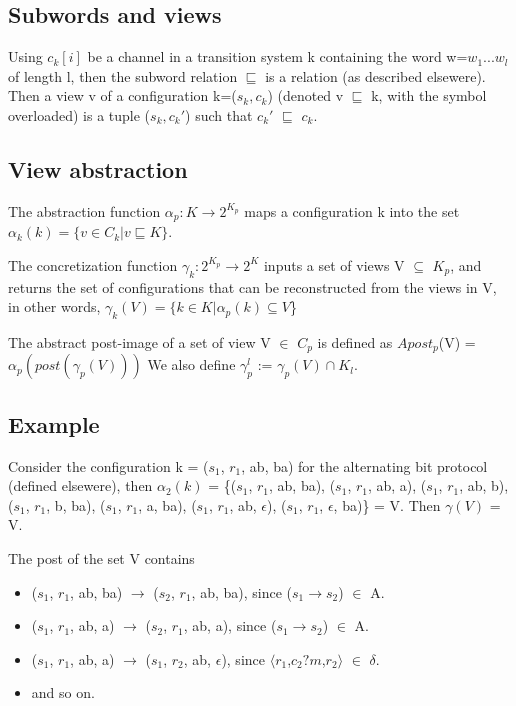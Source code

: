 \documentclass[
10pt, %
a4paper, %
oneside, %
headinclude,footinclude, %
BCOR5mm, %
]{scrartcl}
\begin{document}
\subsection{Subwords and views}

Using $c_k[i]$ be a channel in a transition system k containing the word w=$w_1...w_l$ of length l, then the subword relation $\sqsubseteq$ is a relation (as described elsewere). Then a view v of a configuration k=($s_k,c_k$) (denoted v $\sqsubseteq$ k, with the symbol overloaded) is a tuple ($s_k, c_k'$) such that $c_k'$ $\sqsubseteq$ $c_k$.

\subsection{View abstraction}
The abstraction function $\alpha_p: K\rightarrow 2^{K_p}$ maps a configuration k into the set $\alpha_k(k) = \{v\in C_k | v\sqsubseteq K\}$. 

The concretization function $\gamma_k: 2^{K_p} \rightarrow 2^K$ inputs a set of views V $\subseteq$ $K_p$, and returns the set of configurations that can be reconstructed from the views in V, in other words, $\gamma_k(V) = \{k \in K | \alpha_p(k) \subseteq V$\}

The abstract post-image of a set of view V $\in$ $C_p$ is defined as $Apost_p$(V) = $\alpha_p(post(\gamma_p(V)))$ We also define $\gamma_p^l$ := $\gamma_p(V) \cap K_l$.



\subsection{Example}
Consider the configuration k = ($s_1$, $r_1$, ab, ba) for the alternating bit protocol (defined elsewere), then $\alpha_2(k)$ = \{($s_1$, $r_1$, ab, ba), ($s_1$, $r_1$, ab, a), ($s_1$, $r_1$, ab, b), ($s_1$, $r_1$, b, ba), ($s_1$, $r_1$, a, ba), ($s_1$, $r_1$, ab, $\epsilon$), ($s_1$, $r_1$, $\epsilon$, ba)\} = V. Then $\gamma(V)$ = V.

The post of the set V contains
\begin{itemize}
\item
($s_1$, $r_1$, ab, ba) $\rightarrow$ ($s_2$, $r_1$, ab, ba), since ($s_1$$\rightarrow$$s_2$) $\in$ A.
\item
($s_1$, $r_1$, ab, a) $\rightarrow$ ($s_2$, $r_1$, ab, a), since ($s_1$$\rightarrow$$s_2$) $\in$ A.
\item
($s_1$, $r_1$, ab, a) $\rightarrow$ ($s_1$, $r_2$, ab, $\epsilon$), since $\langle$$r_1$,$c_2?m$,$r_2$$\rangle$ $\in$ $\delta$.
\item
and so on.
\end{itemize}
\end{document}
